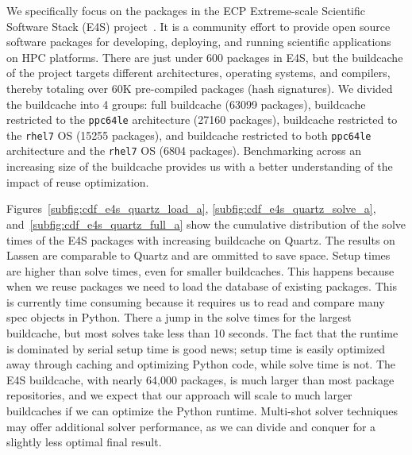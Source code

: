 % 

We specifically focus on the packages in the ECP Extreme-scale Scientific Software Stack
(E4S) project~\cite{e4s}. It is a community effort to provide open source software
packages for developing, deploying, and running scientific applications on HPC
platforms. There are just under 600 packages in E4S, but the buildcache of the project
targets different architectures, operating systems, and compilers, thereby totaling over
60K pre-compiled packages (hash signatures). We divided the buildcache into 4 groups:
full buildcache (63099 packages), buildcache restricted to the \texttt{ppc64le}
architecture (27160 packages), buildcache restricted to the \texttt{rhel7} OS (15255
packages), and buildcache restricted to both \texttt{ppc64le} architecture and the
\texttt{rhel7} OS (6804 packages). Benchmarking across an increasing size of the
buildcache provides us with a better understanding of the impact of reuse optimization.


Figures~\ref{subfig:cdf_e4s_quartz_load_a}, \ref{subfig:cdf_e4s_quartz_solve_a},
and~\ref{subfig:cdf_e4s_quartz_full_a} show the cumulative distribution of the solve
times of the E4S packages with increasing buildcache on Quartz. The results on Lassen
are comparable to Quartz and are ommitted to save space. Setup times are higher than
solve times, even for smaller buildcaches. This happens because when we reuse packages
we need to load the database of existing packages. This is currently time consuming
because it requires us to read and compare many spec objects in Python. There a jump in
the solve times for the largest buildcache, but most solves take less than 10 seconds.
The fact that the runtime is dominated by serial setup time is good news; setup time is
easily optimized away through caching and optimizing Python code, while solve
time is not. The E4S buildcache, with nearly 64,000 packages, is much larger than most
package repositories, and we expect that our approach will scale to much larger
buildcaches if we can optimize the Python runtime. Multi-shot solver techniques may
offer additional solver performance, as we can divide and conquer for a slightly less
optimal final result.

% 
